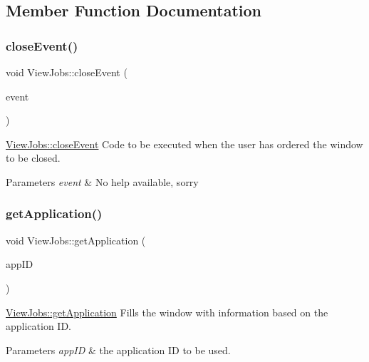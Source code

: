 \subsection{Member Function Documentation}
\mbox{\label{class_view_jobs_a832503ca9eb4e4bf79c2fb48a59141aa}} 
\subsubsection{\texorpdfstring{close\+Event()}{closeEvent()}}
{\footnotesize\ttfamily void View\+Jobs\+::close\+Event (\begin{DoxyParamCaption}\item[{Q\+Close\+Event $\ast$}]{event }\end{DoxyParamCaption})\hspace{0.3cm}{\ttfamily [override]}}



\mbox{\hyperlink{class_view_jobs_a832503ca9eb4e4bf79c2fb48a59141aa}{View\+Jobs\+::close\+Event}} Code to be executed when the user has ordered the window to be closed. 


\begin{DoxyParams}{Parameters}
{\em event} & No help available, sorry \\
\hline
\end{DoxyParams}
\mbox{\label{class_view_jobs_ae9c1c806aa1dd5082b38a1dc9cbec39e}} 
\subsubsection{\texorpdfstring{get\+Application()}{getApplication()}}
{\footnotesize\ttfamily void View\+Jobs\+::get\+Application (\begin{DoxyParamCaption}\item[{int}]{app\+ID }\end{DoxyParamCaption})}



\mbox{\hyperlink{class_view_jobs_ae9c1c806aa1dd5082b38a1dc9cbec39e}{View\+Jobs\+::get\+Application}} Fills the window with information based on the application ID. 


\begin{DoxyParams}{Parameters}
{\em app\+ID} & the application ID to be used. \\
\hline
\end{DoxyParams}
\mbox{\label{class_view_jobs_a086650882ad80acb4074cf697f8cddcb}} 
